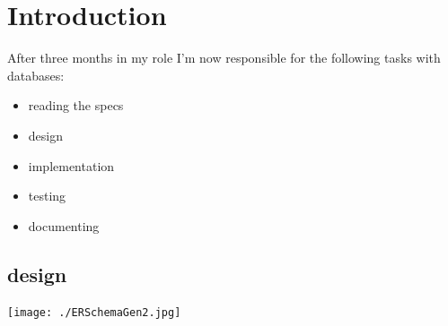 \documentclass[a4paper,12pt]{article}
\begin{document}
 

\section{Introduction}

After three months in my role I'm now responsible for the following tasks with databases:

\begin{itemize}
\item {reading the specs}
\item design
\item implementation
\item testing 
\item documenting
\end{itemize}

\subsection{design}
\texttt{[image: ./ERSchemaGen2.jpg]}

\printindex
\end{document}
